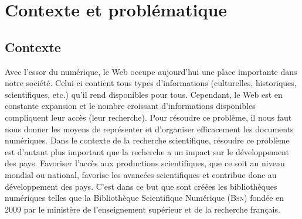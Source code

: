   \chapter{Contexte et problématique}
    \section{Contexte}
      Avec l'essor du numérique, le Web occupe aujourd'hui une place importante
      dans notre société. Celui-ci contient tous types d'informations
      (culturelles, historiques, scientifiques, etc.) qu'il rend disponibles
      pour tous. Cependant, le Web est en constante expansion et le nombre
      croissant d'informations disponibles compliquent leur accès (leur
      recherche). Pour résoudre ce problème, il nous faut nous donner les moyens
      de représenter et d'organiser efficacement les documents numériques. Dans
      le contexte de la recherche scientifique, résoudre ce problème est
      d'autant plus important que la recherche a un impact sur le développement
      des pays. Favoriser l'accès aux productions scientifiques, que ce soit au
      niveau mondial ou national, favorise les avancées scientifiques et
      contribue donc au développement des pays. C'est dans ce but que sont
      créées les bibliothèques numériques telles que la Bibliothèque
      Scientifique Numérique (\textsc{Bsn}) fondée en 2009 par le ministère de
      l'enseignement supérieur et de la recherche français.

